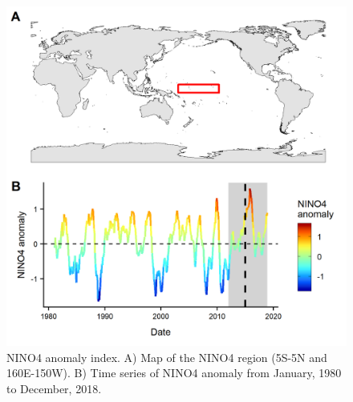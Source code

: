 \documentclass[12pt]{article}
\begin{document}
\begin{figure}
\centering
\includegraphics{img/nino_plot.png}
\caption{\label{fig:nino_plot}NINO4 anomaly index. A) Map of the NINO4 region (5S-5N and 160E-150W). B) Time series of NINO4 anomaly from January, 1980 to December, 2018.}
\end{figure}
\end{document}
